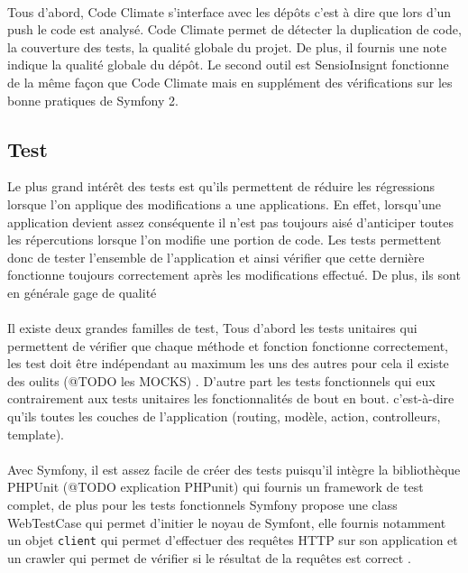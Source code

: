 \paragraph{}
Tous d'abord, Code Climate s'interface avec les dépôts c'est à dire que lors d'un push le code est analysé.
Code Climate permet de détecter la duplication de code, la couverture des tests, la qualité globale du projet. De plus, il fournis une note indique la qualité globale du dépôt. 
Le second outil est SensioInsignt fonctionne de la même façon que Code Climate mais en supplément des vérifications sur les bonne pratiques de Symfony 2.
\subsection{Test}
Le plus grand intérêt des tests est qu'ils permettent de réduire les régressions lorsque l'on applique des modifications a une applications. En effet, lorsqu'une application devient assez conséquente il n'est pas toujours aisé d'anticiper toutes les répercutions lorsque l'on modifie une portion de code. Les tests permettent donc de tester l'ensemble de l'application et ainsi vérifier que cette dernière fonctionne toujours correctement après les modifications effectué. 
De plus, ils sont en générale gage de qualité
 \paragraph{}
 Il existe deux grandes familles de test, Tous d'abord les tests unitaires qui permettent de vérifier que chaque méthode et fonction fonctionne correctement, les test doit être indépendant au maximum les uns des autres pour cela il existe des oulits (@TODO les MOCKS) .
 D'autre part les tests fonctionnels qui eux contrairement aux tests unitaires les fonctionnalités de bout en bout. c'est-à-dire qu'ils toutes les couches de l'application (routing, modèle, action, controlleurs, template).
  \paragraph{}
 Avec Symfony, il est assez facile de créer des tests puisqu'il intègre la bibliothèque PHPUnit (@TODO explication PHPunit) qui fournis un framework de test complet, de plus pour les tests fonctionnels Symfony propose une class WebTestCase qui permet d'initier le noyau de Symfont, elle fournis notamment un objet \verb?client? qui permet d'effectuer des requêtes HTTP sur son application et un crawler qui permet de vérifier si le résultat de la requêtes est correct .
